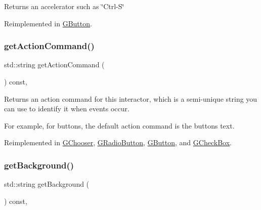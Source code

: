 \begin{DoxyReturn}{Returns}
an accelerator such as \char`\"{}\+Ctrl-\/\+S\char`\"{} 
\end{DoxyReturn}


Reimplemented in \mbox{\hyperlink{classsgl_1_1GButton_a57806dc9defb73f76f493f8548319924}{G\+Button}}.

\mbox{\label{classsgl_1_1GInteractor_a94eb4276000c4fdfb508ce9e6317a82a}} 
\subsubsection{\texorpdfstring{get\+Action\+Command()}{getActionCommand()}}
{\footnotesize\ttfamily std\+::string get\+Action\+Command (\begin{DoxyParamCaption}{ }\end{DoxyParamCaption}) const\hspace{0.3cm}{\ttfamily [virtual]}, {\ttfamily [inherited]}}



Returns an action command for this interactor, which is a semi-\/unique string you can use to identify it when events occur. 

For example, for buttons, the default action command is the button\textquotesingle{}s text. 

Reimplemented in \mbox{\hyperlink{classsgl_1_1GChooser_a4f83505141da1f8446f0e0e0a9507930}{G\+Chooser}}, \mbox{\hyperlink{classsgl_1_1GRadioButton_a4f83505141da1f8446f0e0e0a9507930}{G\+Radio\+Button}}, \mbox{\hyperlink{classsgl_1_1GButton_a4f83505141da1f8446f0e0e0a9507930}{G\+Button}}, and \mbox{\hyperlink{classsgl_1_1GCheckBox_a4f83505141da1f8446f0e0e0a9507930}{G\+Check\+Box}}.

\mbox{\label{classsgl_1_1GInteractor_a808e22cc1fdfbecf71ed8c64ef4600e0}} 
\subsubsection{\texorpdfstring{get\+Background()}{getBackground()}}
{\footnotesize\ttfamily std\+::string get\+Background (\begin{DoxyParamCaption}{ }\end{DoxyParamCaption}) const\hspace{0.3cm}{\ttfamily [virtual]}, {\ttfamily [inherited]}}



